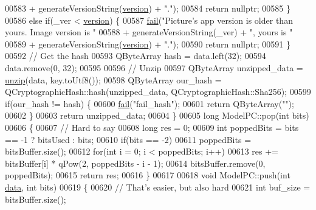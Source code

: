 \begin{DoxyCode}
{00583               + generateVersionString(\hyperlink{class_model_p_c_a5af48ab89e19be42a94c34ba00249401}{version}) + \textcolor{stringliteral}{"."});
00584         \textcolor{keywordflow}{return} \textcolor{keyword}{nullptr};
00585     \}
00586     \textcolor{keywordflow}{else} \textcolor{keywordflow}{if}(\_ver < \hyperlink{class_model_p_c_a5af48ab89e19be42a94c34ba00249401}{version}) \{
00587         \hyperlink{class_model_p_c_a47464b59b7e37fcee25e55475708aabd}{fail}(\textcolor{stringliteral}{"Picture's app version is older than yours. Image version is "}
00588               + generateVersionString(\_ver) + \textcolor{stringliteral}{", yours is "}
00589               + generateVersionString(\hyperlink{class_model_p_c_a5af48ab89e19be42a94c34ba00249401}{version}) + \textcolor{stringliteral}{"."});
00590         \textcolor{keywordflow}{return} \textcolor{keyword}{nullptr};
00591     \}
00592     \textcolor{comment}{// Get the hash}
00593     QByteArray hash = data.left(32);
00594     data.remove(0, 32);
00595 
00596     \textcolor{comment}{// Unzip}
00597     QByteArray unzipped\_data = \hyperlink{class_model_p_c_a6da88f166785a49f73b22c169f956fd0}{unzip}(data, key.toUtf8());
00598     QByteArray our\_hash = QCryptographicHash::hash(unzipped\_data, QCryptographicHash::Sha256);
00599     \textcolor{keywordflow}{if}(our\_hash != hash) \{
00600         \hyperlink{class_model_p_c_a47464b59b7e37fcee25e55475708aabd}{fail}(\textcolor{stringliteral}{"fail\_hash"});
00601         \textcolor{keywordflow}{return} QByteArray(\textcolor{stringliteral}{""});
00602     \}
00603     \textcolor{keywordflow}{return} unzipped\_data;
00604 \}
00605 \textcolor{keywordtype}{long} ModelPC::pop(\textcolor{keywordtype}{int} bits)
00606 \{
00607     \textcolor{comment}{// Hard to say}
00608     \textcolor{keywordtype}{long} res = 0;
00609     \textcolor{keywordtype}{int} poppedBits = bits == -1 ? bitsUsed : bits;
00610     \textcolor{keywordflow}{if}(bits == -2)
00611         poppedBits = bitsBuffer.size();
00612     \textcolor{keywordflow}{for}(\textcolor{keywordtype}{int} i = 0; i < poppedBits; i++)
00613         res += bitsBuffer[i] * qPow(2, poppedBits - i - 1);
00614     bitsBuffer.remove(0, poppedBits);
00615     \textcolor{keywordflow}{return} res;
00616 \}
00617 
00618 \textcolor{keywordtype}{void} ModelPC::push(\textcolor{keywordtype}{int} \hyperlink{namespace_errors_dict_setup_adf4c30d205d29df7343e26f7c62b0685}{data}, \textcolor{keywordtype}{int} bits)
00619 \{
00620     \textcolor{comment}{// That's easier, but also hard}
00621     \textcolor{keywordtype}{int} buf\_size = bitsBuffer.size();
}
\end{DoxyCode}
